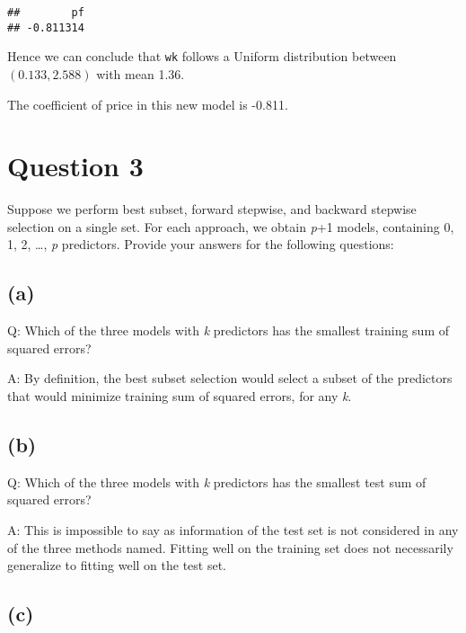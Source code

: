\documentclass[
]{article}
\newenvironment{Shaded}{\begin{snugshade}}{\end{snugshade}}
\newcommand{\DecValTok}[1]{\textcolor[rgb]{0.00,0.00,0.81}{#1}}
\newcommand{\NormalTok}[1]{#1}
\newcommand{\OperatorTok}[1]{\textcolor[rgb]{0.81,0.36,0.00}{\textbf{#1}}}
\newcommand{\StringTok}[1]{\textcolor[rgb]{0.31,0.60,0.02}{#1}}
\begin{document}
\begin{Shaded}
\end{Shaded}

\begin{verbatim}
##        pf 
## -0.811314
\end{verbatim}

Hence we can conclude that \texttt{wk} follows a Uniform distribution
between \((0.133, 2.588)\) with mean 1.36.

The coefficient of price in this new model is -0.811.

\hypertarget{question-3}{%
\section{Question 3}\label{question-3}}

Suppose we perform best subset, forward stepwise, and backward stepwise
selection on a single set. For each approach, we obtain \emph{p}+1
models, containing 0, 1, 2, \ldots, \emph{p} predictors. Provide your
answers for the following questions:

\hypertarget{a}{%
\subsection{(a)}\label{a}}

Q: Which of the three models with \emph{k} predictors has the smallest
training sum of squared errors?

A: By definition, the best subset selection would select a subset of the
predictors that would minimize training sum of squared errors, for any
\emph{k}.

\hypertarget{b-1}{%
\subsection{(b)}\label{b-1}}

Q: Which of the three models with \emph{k} predictors has the smallest
test sum of squared errors?

A: This is impossible to say as information of the test set is not
considered in any of the three methods named. Fitting well on the
training set does not necessarily generalize to fitting well on the test
set.

\hypertarget{c-1}{%
\subsection{(c)}\label{c-1}}
\end{document}

